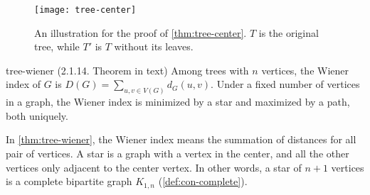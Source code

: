 \documentclass[../src/handouts/main.tex]{subfiles}
\begin{document}
\begin{figure}[htbp]
  \centering
  \texttt{[image: tree-center]}
  \caption{An illustration for the proof of \cref{thm:tree-center}. $T$ is the original tree, while $T'$ is $T$ without its leaves.}
  \label{fig:tree-center}
\end{figure}

\begin{theorem}{}{tree-wiener}
  (2.1.14. Theorem in text)
  Among trees with $n$ vertices, the Wiener index of $G$ is $D(G)=\sum_{u, v \in V(G)} d_G(u, v)$. Under a fixed number of vertices in a graph, the Wiener index is minimized by a star and maximized by a path, both uniquely.
\end{theorem}

In \cref{thm:tree-wiener}, the Wiener index means the summation of distances for all pair of vertices. A star is a graph with a vertex in the center, and all the other vertices only adjacent to the center vertex. In other words, a star of $n + 1$ vertices is a complete bipartite graph $K_{1, n}$ (\cref{def:con-complete}).
\end{document}
